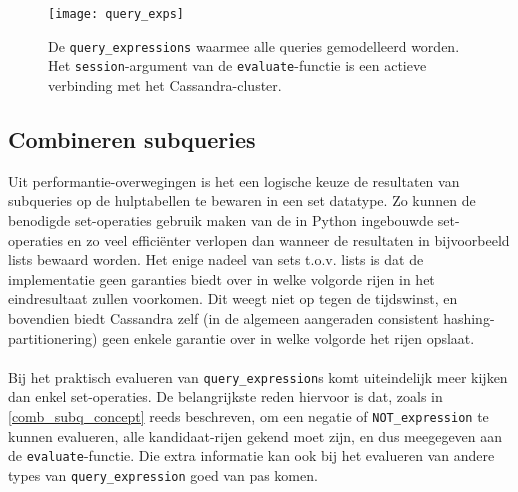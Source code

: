 \begin{figure}[h]
\texttt{[image: query\_exps]}
\caption{De \texttt{query\_expressions} waarmee alle queries gemodelleerd worden. Het \texttt{session}-argument van de \texttt{evaluate}-functie is een actieve verbinding met het Cassandra-cluster.}
\label{query_exps_diagram}
\end{figure}

\subsection{Combineren subqueries}

Uit performantie-overwegingen is het een logische keuze de resultaten van subqueries op de hulptabellen te bewaren in een set datatype. Zo kunnen de benodigde set-operaties gebruik maken van de in Python ingebouwde set-operaties en zo veel effici\"enter verlopen dan wanneer de resultaten in bijvoorbeeld lists bewaard worden. Het enige nadeel van sets t.o.v. lists is dat de implementatie geen garanties biedt over in welke volgorde rijen in het eindresultaat zullen voorkomen. Dit weegt niet op tegen de tijdswinst, en bovendien biedt Cassandra zelf (in de algemeen aangeraden consistent hashing-partitionering) geen enkele garantie over in welke volgorde het rijen opslaat.\\\\
Bij het praktisch evalueren van \texttt{query\_expression}s komt uiteindelijk meer kijken dan enkel set-operaties. De belangrijkste reden hiervoor is dat, zoals in \ref{comb_subq_concept} reeds beschreven, om een negatie of \texttt{NOT\_expression} te kunnen evalueren, alle kandidaat-rijen gekend moet zijn, en dus meegegeven aan de \texttt{evaluate}-functie. Die extra informatie kan ook bij het evalueren van andere types van \texttt{query\_expression} goed van pas komen.
 
